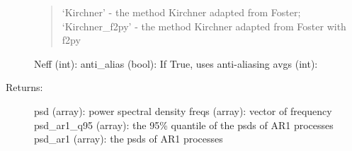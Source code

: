 \documentclass[letterpaper,10pt,english]{sphinxmanual}
\begin{document}
\begin{fulllineitems}
\begin{description}
\begin{quote}
‘Kirchner’ - the method Kirchner adapted from Foster;
‘Kirchner\_f2py’ - the method Kirchner adapted from Foster with f2py
\end{quote}

Neff (int):
anti\_alias (bool): If True, uses anti-aliasing
avgs (int):

\item[{Returns:}] \leavevmode
psd (array): power spectral density
freqs (array): vector of frequency
psd\_ar1\_q95 (array): the 95\% quantile of the psds of AR1 processes
psd\_ar1 (array): the psds of AR1 processes

\end{description}

\end{fulllineitems}

\end{document}
